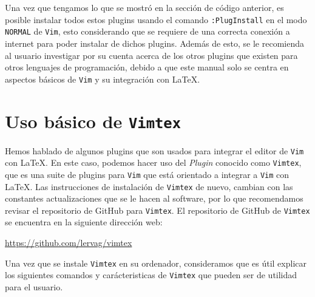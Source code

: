\documentclass[10pt]{article}
\begin{document}
Una vez que tengamos lo que se mostró en la sección de código anterior, es posible instalar todos estos plugins usando el comando \texttt{:PlugInstall} en el modo \texttt{NORMAL} de \texttt{Vim}, esto considerando que se requiere de una correcta conexión a internet para poder instalar de dichos plugins. Además de esto, se le recomienda al usuario investigar por su cuenta acerca de los otros plugins que existen para otros lenguajes de programación, debido a que este manual solo se centra en aspectos básicos de \texttt{Vim} y su integración con \LaTeX. 
\section{Uso básico de \texttt{Vimtex}}	
Hemos hablado de algunos plugins que son usados para integrar el editor de \texttt{Vim} con \LaTeX. En este caso, podemos hacer uso del \textit{Plugin} conocido como \texttt{Vimtex}, que es una suite de plugins para \texttt{Vim} que está orientado a integrar a \texttt{Vim} con \LaTeX. Las instrucciones de instalación de \texttt{Vimtex} de nuevo, cambian con las constantes actualizaciones que se le hacen al software, por lo que recomendamos revisar el repositorio de GitHub para \texttt{Vimtex}.
El repositorio de GitHub de \texttt{Vimtex} se encuentra en la siguiente dirección web:
\begin{center}
	\url{https://github.com/lervag/vimtex}
\end{center}
Una vez que se instale \texttt{Vimtex} en su ordenador, consideramos que es útil explicar los siguientes comandos y carácteristicas de \texttt{Vimtex} que pueden ser de utilidad para el usuario.
\end{document}
